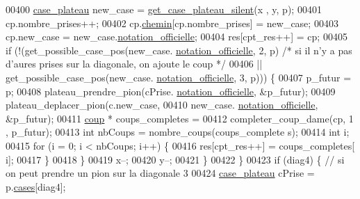 \begin{DoxyCode}
00400                                 \hyperlink{structcase__plateau}{case_plateau} new\_case = \hyperlink{plateau_8h_a60a8f706865d0ae9087f8d65d4667655}{get_case_plateau_silent}(x
      , y, p);
00401                                 cp.nombre\_prises++;
00402                                 cp.\hyperlink{structcoup_aa66b88eb8140c2f459ac92fad0796510}{chemin}[cp.nombre\_prises] = new\_case;
00403                                 cp.new\_case = new\_case.\hyperlink{structcase__plateau_ad510581b324604a9cf685cbb769a421a}{notation_officielle};
00404                                 res[cpt\_res++] = cp;
00405                                 \textcolor{keywordflow}{if} (!(get\_possible\_case\_pos(new\_case.
      \hyperlink{structcase__plateau_ad510581b324604a9cf685cbb769a421a}{notation_officielle}, 2, p) \textcolor{comment}{/* si il n'y a pas d'aures prises sur la diagonale, on
       ajoute le coup */}
00406                                 || get\_possible\_case\_pos(new\_case.
      \hyperlink{structcase__plateau_ad510581b324604a9cf685cbb769a421a}{notation_officielle}, 3, p))) \{
00407                                         p\_futur = p;
00408                                         plateau\_prendre\_pion(cPrise.
      \hyperlink{structcase__plateau_ad510581b324604a9cf685cbb769a421a}{notation_officielle}, &p\_futur);
00409                                         plateau\_deplacer\_pion(c.new\_case,
00410                                                         new\_case.
      \hyperlink{structcase__plateau_ad510581b324604a9cf685cbb769a421a}{notation_officielle}, &p\_futur);
00411                                         \hyperlink{structcoup}{coup} * coups\_completes =
00412                                                         completer\_coup\_dame(cp, 1
      , p\_futur);
00413                                         \textcolor{keywordtype}{int} nbCoups = nombre\_coups(coups\_complete
      s);
00414                                         \textcolor{keywordtype}{int} i;
00415                                         \textcolor{keywordflow}{for} (i = 0; i < nbCoups; i++) \{
00416                                                 res[cpt\_res++] = coups\_completes[
      i];
00417                                         \}
00418                                 \}
00419                                 x--;
00420                                 y--;
00421                         \}
00422                 \}
00423                 \textcolor{keywordflow}{if} (diag4) \{ \textcolor{comment}{// si on peut prendre un pion sur la diagonale 3}
00424                         \hyperlink{structcase__plateau}{case_plateau} cPrise = p.\hyperlink{structplateau_a6afaa60f594542e0d742b0c6d3223392}{cases}[diag4];

\end{DoxyCode}

